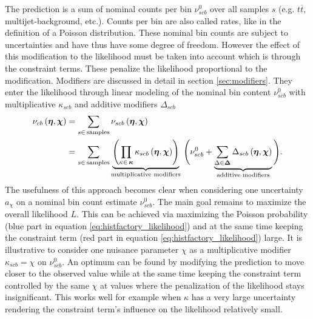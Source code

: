 The prediction is a sum of nominal counts per bin $\nu_{scb}^0$ over all samples $s$ (e.g. $t\overline{t}$, multijet-background, etc.). Counts per bin are also called rates, like in the definition of a Poisson distribution. These nominal bin counts are subject to uncertainties and have thus have some degree of freedom. However the effect of this modification to the likelihood must be taken into account which is through the constraint terms. These penalize the likelihood proportional to the modification. Modifiers are discussed in detail in section \ref{sec:modifiers}. They enter the likelihood through linear modeling of the nominal bin content $\nu_{scb}^0$ with multiplicative $\kappa_{scb}$ and additive modifiers $\Delta_{scb}$ 
\begin{align}
    \nu_{cb}\left(\bm{\eta},\bm{\chi}\right) & = \sum_{s\in\mathrm{\,samples}} \nu_{scb}\left(\bm{\eta},\bm{\chi}\right)                                                                                                \\
                                             & = \sum_{s\in\mathrm{\,samples}}\underbrace{\left(\prod_{\kappa\in\,\bm{\kappa}} \kappa_{scb}\left(\bm{\eta},\bm{\chi}\right)\right)}_{\text{multiplicative modifiers}}\,
    \Bigg(\nu_{scb}^0 + \underbrace{\sum_{\Delta\in\bm{\Delta}} \Delta_{scb}\left(\bm{\eta},\bm{\chi}\right)}_{\text{additive modifiers}}\Bigg).
    \label{eq:modifier_equation}
\end{align}
The usefulness of this approach becomes clear when considering one uncertainty $a_\chi$ on a nominal bin count estimate $\nu_{scb}^0$. The main goal remains to maximize the overall likelihood $L$. This can be achieved via maximizing the Poisson probability (blue part in equation \ref{eq:histfactory_likelihood}) and at the same time keeping the constraint term (red part in equation \ref{eq:histfactory_likelihood}) large. It is illustrative to consider one nuisance parameter $\chi$ as a multiplicative modifier $\kappa_{scb}=\chi$ on $\nu_{scb}^0$. An optimum can be found by modifying the prediction to move closer to the observed value while at the same time keeping the constraint term controlled by the same $\chi$ at values where the penalization of the likelihood stays insignificant. This works well for example when $\kappa$ has a very large uncertainty rendering the constraint term's influence on the likelihood relatively small. 

